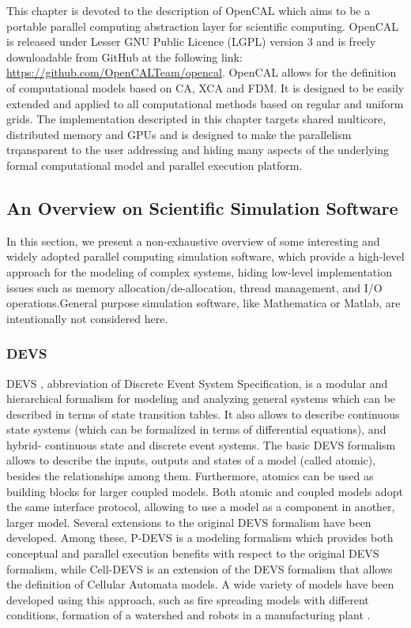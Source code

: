This chapter is devoted to the description of OpenCAL which aims to be a portable parallel computing abstraction layer for scientific computing. OpenCAL is released under Lesser GNU Public Licence (LGPL) version 3 and is freely downloadable from GitHub at the following link: \url{https://github.com/OpenCALTeam/opencal}. OpenCAL allows for  the definition of computational models based on CA, XCA and FDM. It is designed to be easily extended and applied to all computational methods based on regular and uniform grids. 
The implementation descripted in this chapter targets shared multicore, distributed memory and GPUs and is designed to make the parallelism trqansparent to the user addressing and hiding many aspects of the underlying formal computational model and parallel execution platform. 

\subsection{An Overview on Scientific Simulation Software}
In this section, we present a non-exhaustive overview of some
  interesting and widely adopted parallel computing simulation software, which provide a
  high-level approach for the modeling of complex systems, hiding  low-level implementation issues such as memory allocation/de-allocation, thread management, and I/O  operations.General purpose simulation software,
  like Mathematica or Matlab, are intentionally not considered here.
\subsubsection{DEVS}
  DEVS \cite{Zeigler:1997:DEH:615253.615512, Zeigler:2000:TMS:580780},
  abbreviation of Discrete Event System Specification, is a modular
  and hierarchical formalism for modeling and analyzing general
  systems which can be described in terms of state transition
  tables. It also allows to describe continuous state systems (which
  can be formalized in terms of differential equations), and hybrid-
  continuous state and discrete event systems. The basic DEVS
  formalism allows to describe the inputs, outputs and states of a
  model (called atomic), besides the relationships among
  them. Furthermore, atomics can be used as building blocks for larger
  coupled models. Both atomic and coupled models adopt the same
  interface protocol, allowing to use a model as a component in
  another, larger model. Several extensions to the original DEVS
  formalism have been developed. Among these, P-DEVS
  \cite{Chow:1994:PDP:193201.194336} is a modeling formalism which
  provides both conceptual and parallel execution benefits with
  respect to the original DEVS formalism, while Cell-DEVS
  \cite{Wainer:2009:DMS:1611320} is an extension of the DEVS formalism
  that allows the definition of Cellular Automata models. A wide
  variety of models have been developed using this approach, such as
  fire spreading models with different conditions, formation of a
  watershed and robots in a manufacturing plant
  \cite{Troccoli:2001:MCP:882496.884491}.
